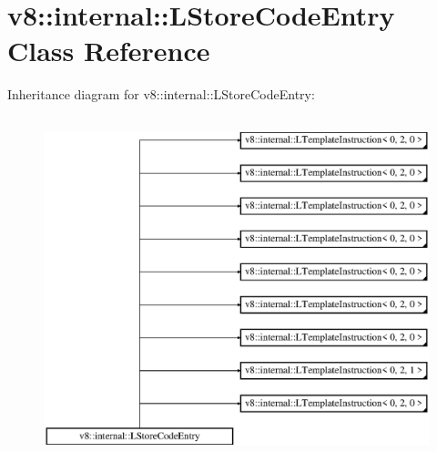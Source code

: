 \hypertarget{classv8_1_1internal_1_1_l_store_code_entry}{}\section{v8\+:\+:internal\+:\+:L\+Store\+Code\+Entry Class Reference}
\label{classv8_1_1internal_1_1_l_store_code_entry}
Inheritance diagram for v8\+:\+:internal\+:\+:L\+Store\+Code\+Entry\+:\begin{figure}[H]
\begin{center}
\leavevmode
\includegraphics[height=10.000000cm]{classv8_1_1internal_1_1_l_store_code_entry}
\end{center}
\end{figure}
